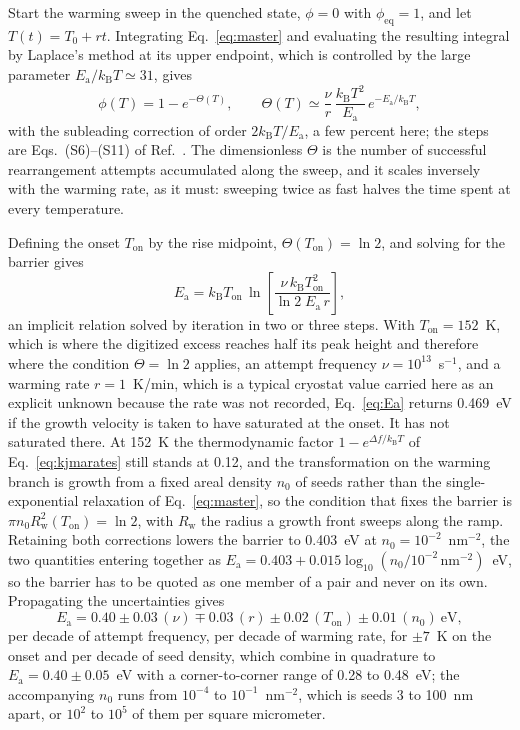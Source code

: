 \documentclass[reprint,twocolumn,prb,amsmath,amssymb,superscriptaddress,floatfix]{revtex4-2}
\newcommand{\kB}{k_{\mathrm{B}}}
\newcommand{\Ea}{E_{\mathrm{a}}}
\newcommand{\Ton}{T_{\mathrm{on}}}
\begin{document}
Start the warming sweep in the quenched state, $\phi=0$ with $\phi_{\mathrm{eq}}=1$, and let
$T(t)=T_{0}+rt$. Integrating Eq.~\eqref{eq:master} and evaluating the resulting integral by
Laplace's method at its upper endpoint, which is controlled by the large parameter
$\Ea/\kB T\simeq31$, gives
\begin{equation}
  \phi(T) = 1-e^{-\Theta(T)},
  \qquad
  \Theta(T) \simeq \frac{\nu}{r}\,\frac{\kB T^{2}}{\Ea}\,e^{-\Ea/\kB T},
  \label{eq:theta}
\end{equation}
with the subleading correction of order $2\kB T/\Ea$, a few percent here; the steps are
Eqs.~(S6)--(S11) of Ref.~\cite{SM}. The dimensionless $\Theta$ is the number of successful
rearrangement attempts accumulated along the sweep, and it scales inversely with the warming
rate, as it must: sweeping twice as fast halves the time spent at every temperature.

Defining the onset $\Ton$ by the rise midpoint, $\Theta(\Ton)=\ln2$, and solving for the
barrier gives
\begin{equation}
  \Ea = \kB\Ton\,
  \ln\!\left[\frac{\nu\,\kB\Ton^{2}}{\ln2\;\Ea\,r}\right],
  \label{eq:Ea}
\end{equation}
an implicit relation solved by iteration in two or three steps. With $\Ton=152$~K, which is
where the digitized excess reaches half its peak height and therefore where the condition
$\Theta=\ln2$ applies, an attempt
frequency $\nu=10^{13}$~s$^{-1}$, and a warming rate $r=1$~K/min, which is a typical
cryostat value carried here as an explicit unknown because the rate was not recorded,
Eq.~\eqref{eq:Ea} returns 0.469~eV if the growth velocity is taken to have saturated at the
onset. It has not saturated there. At 152~K the thermodynamic factor $1-e^{\Delta f/\kB T}$ of
Eq.~\eqref{eq:kjmarates} still stands at 0.12, and the transformation on the warming branch is
growth from a fixed areal density $n_{0}$ of seeds rather than the single-exponential relaxation
of Eq.~\eqref{eq:master}, so the condition that fixes the barrier is $\pi n_{0}
R_{\mathrm{w}}^{2}(\Ton)=\ln2$, with $R_{\mathrm{w}}$ the radius a growth front sweeps along the
ramp. Retaining both corrections lowers the barrier to 0.403~eV at $n_{0}=10^{-2}$~nm$^{-2}$,
the two quantities entering together as
$\Ea=0.403+0.015\log_{10}(n_{0}/10^{-2}\,\mathrm{nm}^{-2})$~eV, so the barrier has to be quoted
as one member of a pair and never on its own. Propagating the uncertainties gives
\begin{equation*}
  \Ea = 0.40 \pm 0.03\,(\nu) \mp 0.03\,(r) \pm 0.02\,(\Ton) \pm 0.01\,(n_{0})\ \mathrm{eV},
\end{equation*}
per decade of attempt frequency, per decade of warming rate, for $\pm7$~K on the onset and per
decade of seed density, which combine in quadrature to $\Ea=0.40\pm0.05$~eV with a
corner-to-corner range of 0.28 to 0.48~eV; the accompanying $n_{0}$ runs from $10^{-4}$ to
$10^{-1}$~nm$^{-2}$, which is seeds 3 to 100~nm apart, or $10^{2}$ to $10^{5}$ of them per
square micrometer.
\end{document}
